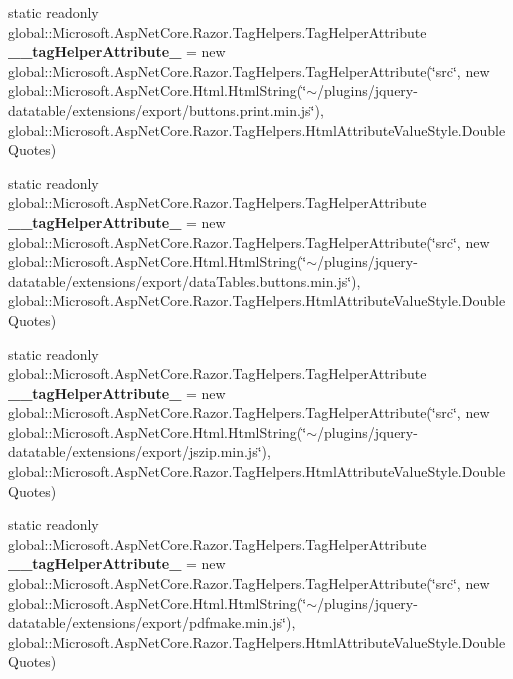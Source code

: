 \begin{DoxyCompactItemize}
static readonly global\+::\+Microsoft.\+Asp\+Net\+Core.\+Razor.\+Tag\+Helpers.\+Tag\+Helper\+Attribute {\bfseries \+\_\+\+\_\+tag\+Helper\+Attribute\+\_} = new global\+::\+Microsoft.\+Asp\+Net\+Core.\+Razor.\+Tag\+Helpers.\+Tag\+Helper\+Attribute(\char`\"{}src\char`\"{}, new global\+::\+Microsoft.\+Asp\+Net\+Core.\+Html.\+Html\+String(\char`\"{}$\sim$/plugins/jquery-\/datatable/extensions/export/buttons.\+print.\+min.\+js\char`\"{}), global\+::\+Microsoft.\+Asp\+Net\+Core.\+Razor.\+Tag\+Helpers.\+Html\+Attribute\+Value\+Style.\+Double\+Quotes)
\item 
\mbox{\label{class_asp_net_core_1_1_views___volunteers___index_aa9204117e80a444c9648005f77078aa9}} 
static readonly global\+::\+Microsoft.\+Asp\+Net\+Core.\+Razor.\+Tag\+Helpers.\+Tag\+Helper\+Attribute {\bfseries \+\_\+\+\_\+tag\+Helper\+Attribute\+\_} = new global\+::\+Microsoft.\+Asp\+Net\+Core.\+Razor.\+Tag\+Helpers.\+Tag\+Helper\+Attribute(\char`\"{}src\char`\"{}, new global\+::\+Microsoft.\+Asp\+Net\+Core.\+Html.\+Html\+String(\char`\"{}$\sim$/plugins/jquery-\/datatable/extensions/export/data\+Tables.\+buttons.\+min.\+js\char`\"{}), global\+::\+Microsoft.\+Asp\+Net\+Core.\+Razor.\+Tag\+Helpers.\+Html\+Attribute\+Value\+Style.\+Double\+Quotes)
\item 
\mbox{\label{class_asp_net_core_1_1_views___volunteers___index_a77cc9c8f2668d18116c51b0033095c0c}} 
static readonly global\+::\+Microsoft.\+Asp\+Net\+Core.\+Razor.\+Tag\+Helpers.\+Tag\+Helper\+Attribute {\bfseries \+\_\+\+\_\+tag\+Helper\+Attribute\+\_} = new global\+::\+Microsoft.\+Asp\+Net\+Core.\+Razor.\+Tag\+Helpers.\+Tag\+Helper\+Attribute(\char`\"{}src\char`\"{}, new global\+::\+Microsoft.\+Asp\+Net\+Core.\+Html.\+Html\+String(\char`\"{}$\sim$/plugins/jquery-\/datatable/extensions/export/jszip.\+min.\+js\char`\"{}), global\+::\+Microsoft.\+Asp\+Net\+Core.\+Razor.\+Tag\+Helpers.\+Html\+Attribute\+Value\+Style.\+Double\+Quotes)
\item 
\mbox{\label{class_asp_net_core_1_1_views___volunteers___index_a20cb5683ddde98076577440ac7dfed3e}} 
static readonly global\+::\+Microsoft.\+Asp\+Net\+Core.\+Razor.\+Tag\+Helpers.\+Tag\+Helper\+Attribute {\bfseries \+\_\+\+\_\+tag\+Helper\+Attribute\+\_} = new global\+::\+Microsoft.\+Asp\+Net\+Core.\+Razor.\+Tag\+Helpers.\+Tag\+Helper\+Attribute(\char`\"{}src\char`\"{}, new global\+::\+Microsoft.\+Asp\+Net\+Core.\+Html.\+Html\+String(\char`\"{}$\sim$/plugins/jquery-\/datatable/extensions/export/pdfmake.\+min.\+js\char`\"{}), global\+::\+Microsoft.\+Asp\+Net\+Core.\+Razor.\+Tag\+Helpers.\+Html\+Attribute\+Value\+Style.\+Double\+Quotes)

\end{DoxyCompactItemize}
